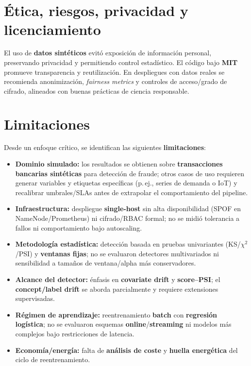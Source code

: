 \section{Ética, riesgos, privacidad y licenciamiento}
El uso de \textbf{datos sintéticos} evitó exposición de información personal, preservando privacidad y permitiendo control estadístico. El código bajo \textbf{MIT} promueve transparencia y reutilización. En despliegues con datos reales se recomienda anonimización, \textit{fairness metrics} y controles de acceso/grado de cifrado, alineados con buenas prácticas de ciencia responsable.

\section{Limitaciones}
\label{sec:limitaciones}
Desde un enfoque crítico, se identifican las siguientes \textbf{limitaciones}:
\begin{itemize}\setlength\itemsep{2pt}
  \item \textbf{Dominio simulado:} los resultados se obtienen sobre \textbf{transacciones bancarias sintéticas} para detección de fraude; otros casos de uso requieren generar variables y etiquetas específicas (p.\,ej., series de demanda o IoT) y recalibrar umbrales/SLAs antes de extrapolar el comportamiento del pipeline.
  \item \textbf{Infraestructura:} despliegue \textbf{single-host} sin alta disponibilidad (SPOF en NameNode/Prometheus) ni cifrado/RBAC formal; no se midió tolerancia a fallos ni comportamiento bajo autoscaling.
  \item \textbf{Metodología estadística:} detección basada en pruebas univariantes (KS/$\chi^2$/PSI) y \textbf{ventanas fijas}; no se evaluaron detectores multivariados ni sensibilidad a tamaños de ventana/alpha más conservadores.
  \item \textbf{Alcance del detector:} énfasis en \textbf{covariate drift} y \textbf{score–PSI}; el \textbf{concept/label drift} se aborda parcialmente y requiere extensiones supervisadas.
  \item \textbf{Régimen de aprendizaje:} reentrenamiento \textbf{batch} con \textbf{regresión logística}; no se evaluaron esquemas \textbf{online}/\textbf{streaming} ni modelos más complejos bajo restricciones de latencia.
  \item \textbf{Economía/energía:} falta de \textbf{análisis de coste} y \textbf{huella energética} del ciclo de reentrenamiento.
\end{itemize}

